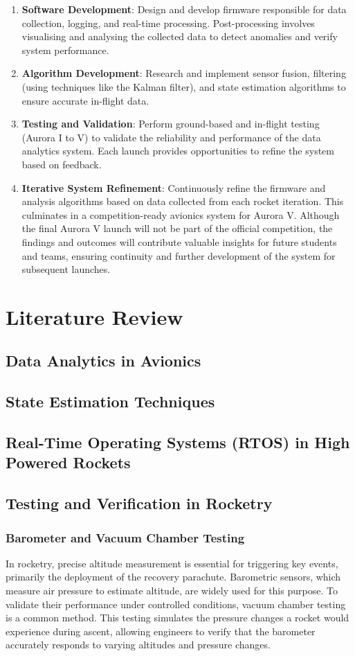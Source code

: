 \begin{enumerate}
    \item \textbf{Software Development}: Design and develop firmware responsible for data collection, logging, and real-time processing. Post-processing involves visualising and analysing the collected data to detect anomalies and verify system performance.
    \item \textbf{Algorithm Development}: Research and implement sensor fusion, filtering (using techniques like the Kalman filter), and state estimation algorithms to ensure accurate in-flight data.
    \item \textbf{Testing and Validation}: Perform ground-based and in-flight testing (Aurora I to V) to validate the reliability and performance of the data analytics system. Each launch provides opportunities to refine the system based on feedback.
    \item \textbf{Iterative System Refinement}: Continuously refine the firmware and analysis algorithms based on data collected from each rocket iteration. This culminates in a competition-ready avionics system for Aurora V. Although the final Aurora V launch will not be part of the official competition, the findings and outcomes will contribute valuable insights for future students and teams, ensuring continuity and further development of the system for subsequent launches.
\end{enumerate}


\section{Literature Review}
\subsection{Data Analytics in Avionics}
\subsection{State Estimation Techniques}
\subsection{Real-Time Operating Systems (RTOS) in High Powered Rockets}
\subsection{Testing and Verification in Rocketry}

\subsubsection{Barometer and Vacuum Chamber Testing}
In rocketry, precise altitude measurement is essential for triggering key events, primarily the deployment of the recovery parachute. Barometric sensors, which measure air pressure to estimate altitude, are widely used for this purpose. To validate their performance under controlled conditions, vacuum chamber testing is a common method. This testing simulates the pressure changes a rocket would experience during ascent, allowing engineers to verify that the barometer accurately responds to varying altitudes and pressure changes. 

